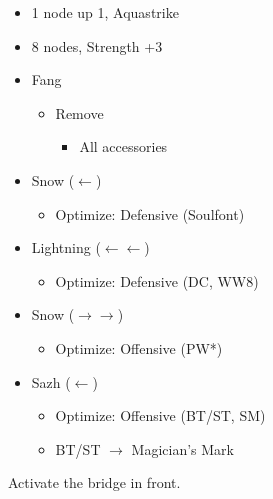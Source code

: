 \begin{menu}
\begin{itemize}
\begin{itemize}
\begin{itemize}
\begin{itemize}
						            \item 1 node up 1, Aquastrike
						            \item 8 nodes, Strength +3
					            \end{itemize}
				      \end{itemize}
			\end{itemize}
			\equip
			\begin{itemize}
				\item Fang
				      \begin{itemize}
					      \item Remove
					            \begin{itemize}
						            \item All accessories
					            \end{itemize}
				      \end{itemize}
				\item Snow ($\leftarrow$)
				      \begin{itemize}
					      \item Optimize: Defensive (Soulfont)
				      \end{itemize}
				\item Lightning ($\leftarrow\leftarrow$)
				      \begin{itemize}
					      \item Optimize: Defensive (DC, WW8)
				      \end{itemize}
				\item Snow ($\rightarrow\rightarrow$)
				      \begin{itemize}
					      \item Optimize: Offensive (PW*)
				      \end{itemize}
				\item Sazh ($\leftarrow$)
				      \begin{itemize}
					      \item Optimize: Offensive (BT/ST, SM)
					      \item BT/ST $\rightarrow$ Magician's Mark
				      \end{itemize}
			\end{itemize}
		\end{itemize}
	\end{menu}

	Activate the bridge in front.

